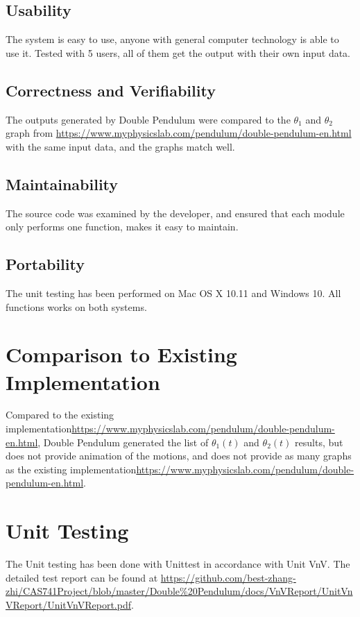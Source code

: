 \documentclass[12pt, titlepage]{article}
\begin{document}
\subsection{Usability}
The system is easy to use, anyone with general computer technology is able to use it. Tested with 5 users, all of them get the output with their own input data. 

\subsection{Correctness and Verifiability}
The outputs generated by Double Pendulum were compared to the $\theta_1$ and $\theta_2$ graph from \url{https://www.myphysicslab.com/pendulum/double-pendulum-en.html} with the same input data, and the graphs match well. 

\subsection{Maintainability}
The source code was examined by the developer, and ensured that each module only performs one function, makes it easy to maintain.  


\subsection{Portability}
The unit testing has been performed on Mac OS X 10.11 and Windows 10. All functions works on both systems.
	
\section{Comparison to Existing Implementation}	
Compared to the existing implementation\url{https://www.myphysicslab.com/pendulum/double-pendulum-en.html}, Double Pendulum generated the list of $\theta_1(t)$ and $\theta_2(t)$ results, but does not provide animation of the motions, and does not provide as many graphs as the existing implementation\url{https://www.myphysicslab.com/pendulum/double-pendulum-en.html}. 

\section{Unit Testing}
The Unit testing has been done with Unittest in accordance with Unit VnV. The detailed test report can be found at \url{https://github.com/best-zhang-zhi/CAS741Project/blob/master/Double%20Pendulum/docs/VnVReport/UnitVnVReport/UnitVnVReport.pdf}. 
\end{document}
